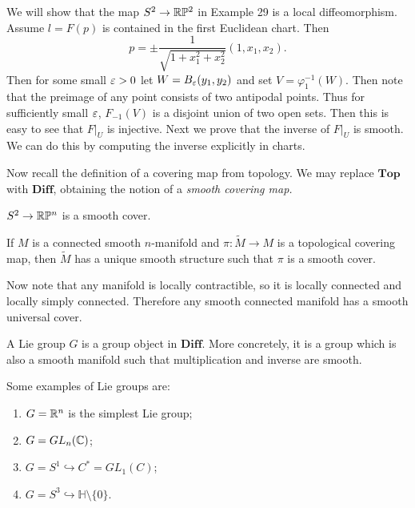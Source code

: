 \documentclass[twoside, 10pt]{article}
\begin{document}
    
    We will show that the map $S^2 \to \mathbb{R}\mathbb{P}^2$ in Example 29 is a local diffeomorphism. Assume $l = F(p)$ is contained in the first Euclidean chart. Then 
    \[p = \pm \frac{1}{\sqrt{1+x_1^2+x_2^2}}(1,x_1,x_2).\] Then for some small $\varepsilon > 0$ let $W = B_{\varepsilon}(y_1,y_2)$ and set $V = \varphi_1^{-1}(W)$. Then note that the preimage of any point consists of two antipodal points. Thus for sufficiently small $\varepsilon$, $F_{-1}(V)$ is a disjoint union of two open sets. Then this is easy to see that $F|_U$ is injective. Next we prove that the inverse of $F|_U$ is smooth. We can do this by computing the inverse explicitly in charts.

    Now recall the definition of a covering map from topology. We may replace $\mathbf{Top}$ with $\mathbf{Diff}$, obtaining the notion of a \textit{smooth covering map.}

    \begin{exm}
        $S^2 \to \mathbb{R}\mathbb{P}^n$ is a smooth cover.
    \end{exm}

    \begin{prop}
        If $M$ is a connected smooth $n$-manifold and $\pi: \widetilde{M} \to M$ is a topological covering map, then $\widetilde{M}$ has a unique smooth structure such that $\pi$ is a smooth cover.
    \end{prop}

    Now note that any manifold is locally contractible, so it is locally connected and locally simply connected. Therefore any smooth connected manifold has a smooth universal cover.

    \begin{defn}
        A Lie group $G$ is a group object in $\mathbf{Diff}$. More concretely, it is a group which is also a smooth manifold such that multiplication and inverse are smooth.
    \end{defn}

    \begin{exm}
        Some examples of Lie groups are:
        \begin{enumerate}
            \item $G = \mathbb{R}^n$ is the simplest Lie group;
            \item $G = GL_n(\mathbb{C})$;
            \item $G = S^1 \hookrightarrow C^* = GL_1(C)$;
            \item $G = S^3 \hookrightarrow \mathbb{H} \setminus \{0\}$.
        \end{enumerate}
    \end{exm}
\end{document}
